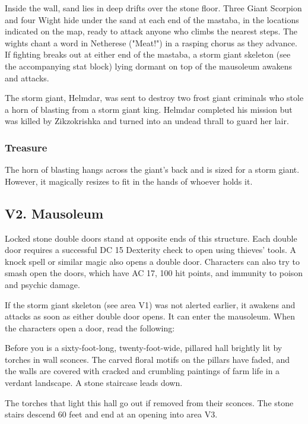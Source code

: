 \documentclass[10pt,a4paper,twoside,bg=print,twocolumn,openany,nodeprecatedcode]{dndbook}
\begin{document}
Inside the wall, sand lies in deep drifts over the stone floor. Three Giant Scorpion and four Wight hide under the sand at each end of the mastaba, in the locations indicated on the map, ready to attack anyone who climbs the nearest steps. The wights chant a word in Netherese ("Meat!") in a rasping chorus as they advance. If fighting breaks out at either end of the mastaba, a storm giant skeleton (see the accompanying stat block) lying dormant on top of the mausoleum awakens and attacks.

The storm giant, Helmdar, was sent to destroy two frost giant criminals who stole a horn of blasting from a storm giant king. Helmdar completed his mission but was killed by Zikzokrishka and turned into an undead thrall to guard her lair.

\subsubsection{Treasure}
The horn of blasting hangs across the giant's back and is sized for a storm giant. However, it magically resizes to fit in the hands of whoever holds it.

\subsection{V2. Mausoleum}
Locked stone double doors stand at opposite ends of this structure. Each double door requires a successful DC 15 Dexterity check to open using thieves' tools. A knock spell or similar magic also opens a double door. Characters can also try to smash open the doors, which have AC 17, 100 hit points, and immunity to poison and psychic damage.

If the storm giant skeleton (see area V1) was not alerted earlier, it awakens and attacks as soon as either double door opens. It can enter the mausoleum. When the characters open a door, read the following:

\begin{DndReadAloud}{}
Before you is a sixty-foot-long, twenty-foot-wide, pillared hall brightly lit by torches in wall sconces. The carved floral motifs on the pillars have faded, and the walls are covered with cracked and crumbling paintings of farm life in a verdant landscape. A stone staircase leads down.

\end{DndReadAloud}

The torches that light this hall go out if removed from their sconces. The stone stairs descend 60 feet and end at an opening into area V3.
\end{document}
